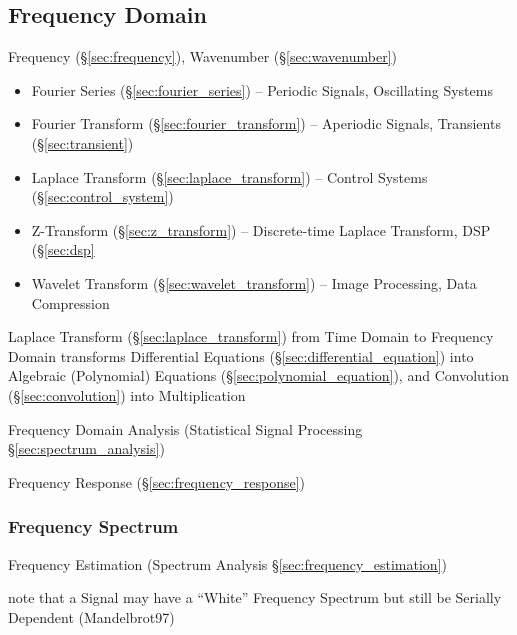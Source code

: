 \subsection{Frequency Domain}\label{sec:frequency_domain}

Frequency (\S\ref{sec:frequency}), Wavenumber (\S\ref{sec:wavenumber})

\begin{itemize}
  \item Fourier Series (\S\ref{sec:fourier_series}) -- Periodic Signals,
    Oscillating Systems
  \item Fourier Transform (\S\ref{sec:fourier_transform}) -- Aperiodic Signals,
    Transients (\S\ref{sec:transient})
  \item Laplace Transform (\S\ref{sec:laplace_transform}) -- Control Systems
    (\S\ref{sec:control_system})
  \item Z-Transform (\S\ref{sec:z_transform}) -- Discrete-time Laplace
    Transform, DSP (\S\ref{sec:dsp}
  \item Wavelet Transform (\S\ref{sec:wavelet_transform}) -- Image Processing,
    Data Compression
\end{itemize}

Laplace Transform (\S\ref{sec:laplace_transform}) from Time Domain to Frequency
Domain transforms Differential Equations (\S\ref{sec:differential_equation})
into Algebraic (Polynomial) Equations (\S\ref{sec:polynomial_equation}), and
Convolution (\S\ref{sec:convolution}) into Multiplication

\fist Frequency Domain Analysis (Statistical Signal Processing
\S\ref{sec:spectrum_analysis})

\fist Frequency Response (\S\ref{sec:frequency_response})



\subsubsection{Frequency Spectrum}\label{sec:frequency_spectrum}

\fist Frequency Estimation (Spectrum Analysis \S\ref{sec:frequency_estimation})

note that a Signal may have a ``White'' Frequency Spectrum but still be Serially
Dependent (Mandelbrot97)



